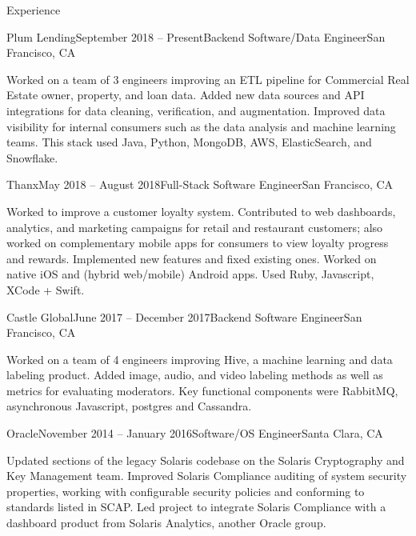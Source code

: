\documentclass{resume} %
\begin{document}

\begin{rSection}{Experience}

\begin{rSubsection}{Plum Lending}{September 2018 -- Present}{Backend Software/Data Engineer}{San Francisco, CA}
\item Worked on a team of 3 engineers improving an ETL pipeline for Commercial Real Estate owner, property, and loan data. Added new data sources and API integrations for data cleaning, verification, and augmentation. Improved data visibility for internal consumers such as the data analysis and machine learning teams. This stack used Java, Python, MongoDB, AWS, ElasticSearch, and Snowflake.
\end{rSubsection}

\begin{rSubsection}{Thanx}{May 2018 -- August 2018}{Full-Stack Software Engineer}{San Francisco, CA}
\item Worked to improve a customer loyalty system. Contributed to web dashboards, analytics, and marketing campaigns for retail and restaurant customers; also worked on complementary mobile apps for consumers to view loyalty progress and rewards. Implemented new features and fixed existing ones. Worked on native iOS and (hybrid web/mobile) Android apps. Used Ruby, Javascript, XCode + Swift.
\end{rSubsection}

\begin{rSubsection}{Castle Global}{June 2017 -- December 2017}{Backend Software Engineer}{San Francisco, CA}
\item Worked on a team of 4 engineers improving Hive, a machine learning and data labeling product. Added image, audio, and video labeling methods as well as metrics for evaluating moderators. Key functional components were RabbitMQ, asynchronous Javascript, postgres and Cassandra.
\end{rSubsection}

\begin{rSubsection}{Oracle}{November 2014 -- January 2016}{Software/OS Engineer}{Santa Clara, CA}
\item Updated sections of the legacy Solaris codebase on the Solaris Cryptography and Key Management team. Improved Solaris Compliance auditing of system security properties, working with configurable security policies and conforming to standards listed in SCAP. Led project to integrate Solaris Compliance with a dashboard product from Solaris Analytics, another Oracle group. 
\end{rSubsection}


\end{rSection}
\end{document}
